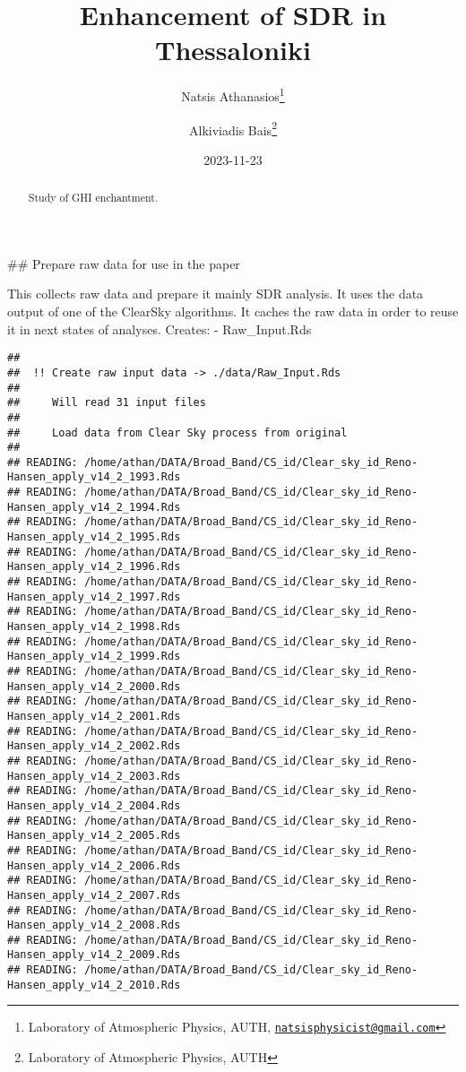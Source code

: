 \documentclass[
  10pt,
  a4paper,oneside]{article}
\title{Enhancement of SDR in Thessaloniki}
\author{Natsis Athanasios\footnote{Laboratory of Atmospheric Physics, AUTH, \href{mailto:natsisphysicist@gmail.com}{\nolinkurl{natsisphysicist@gmail.com}}} \and Alkiviadis Bais\footnote{Laboratory of Atmospheric Physics, AUTH}}
\date{2023-11-23}
\begin{document}
\maketitle
\begin{abstract}
Study of GHI enchantment.
\end{abstract}

{
\hypersetup{linkcolor=}
\setcounter{tocdepth}{4}
\tableofcontents
}
\#\# Prepare raw data for use in the paper

This collects raw data and prepare it mainly SDR analysis.
It uses the data output of one of the ClearSky algorithms.
It caches the raw data in order to reuse it in next states of analyses.
Creates:
- Raw\_Input.Rds

\begin{verbatim}
## 
##  !! Create raw input data -> ./data/Raw_Input.Rds 
## 
##     Will read 31 input files
## 
##     Load data from Clear Sky process from original
## 
## READING: /home/athan/DATA/Broad_Band/CS_id/Clear_sky_id_Reno-Hansen_apply_v14_2_1993.Rds 
## READING: /home/athan/DATA/Broad_Band/CS_id/Clear_sky_id_Reno-Hansen_apply_v14_2_1994.Rds 
## READING: /home/athan/DATA/Broad_Band/CS_id/Clear_sky_id_Reno-Hansen_apply_v14_2_1995.Rds 
## READING: /home/athan/DATA/Broad_Band/CS_id/Clear_sky_id_Reno-Hansen_apply_v14_2_1996.Rds 
## READING: /home/athan/DATA/Broad_Band/CS_id/Clear_sky_id_Reno-Hansen_apply_v14_2_1997.Rds 
## READING: /home/athan/DATA/Broad_Band/CS_id/Clear_sky_id_Reno-Hansen_apply_v14_2_1998.Rds 
## READING: /home/athan/DATA/Broad_Band/CS_id/Clear_sky_id_Reno-Hansen_apply_v14_2_1999.Rds 
## READING: /home/athan/DATA/Broad_Band/CS_id/Clear_sky_id_Reno-Hansen_apply_v14_2_2000.Rds 
## READING: /home/athan/DATA/Broad_Band/CS_id/Clear_sky_id_Reno-Hansen_apply_v14_2_2001.Rds 
## READING: /home/athan/DATA/Broad_Band/CS_id/Clear_sky_id_Reno-Hansen_apply_v14_2_2002.Rds 
## READING: /home/athan/DATA/Broad_Band/CS_id/Clear_sky_id_Reno-Hansen_apply_v14_2_2003.Rds 
## READING: /home/athan/DATA/Broad_Band/CS_id/Clear_sky_id_Reno-Hansen_apply_v14_2_2004.Rds 
## READING: /home/athan/DATA/Broad_Band/CS_id/Clear_sky_id_Reno-Hansen_apply_v14_2_2005.Rds 
## READING: /home/athan/DATA/Broad_Band/CS_id/Clear_sky_id_Reno-Hansen_apply_v14_2_2006.Rds 
## READING: /home/athan/DATA/Broad_Band/CS_id/Clear_sky_id_Reno-Hansen_apply_v14_2_2007.Rds 
## READING: /home/athan/DATA/Broad_Band/CS_id/Clear_sky_id_Reno-Hansen_apply_v14_2_2008.Rds 
## READING: /home/athan/DATA/Broad_Band/CS_id/Clear_sky_id_Reno-Hansen_apply_v14_2_2009.Rds 
## READING: /home/athan/DATA/Broad_Band/CS_id/Clear_sky_id_Reno-Hansen_apply_v14_2_2010.Rds 

\end{verbatim}
\end{document}
